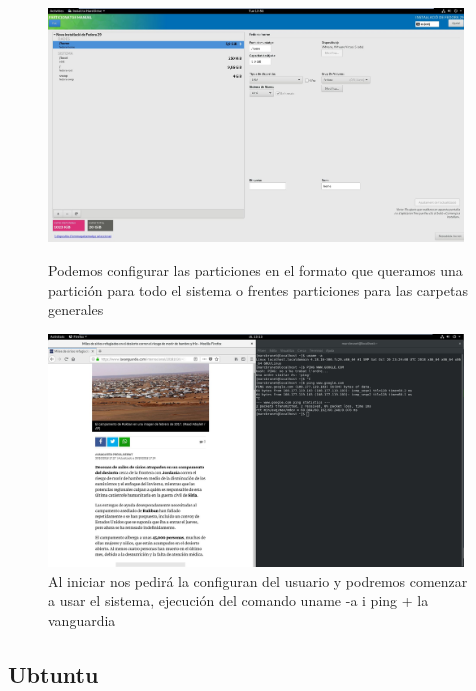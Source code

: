 \documentclass[preprint,11pt]{elsarticle}
\begin{document}
\begin{figure}[!htbp]
    \begin{center}
        \includegraphics[width=11cm]{anex/fedora3.JPG}
    \end{center}
    \caption{Podemos configurar las particiones en el formato que queramos una partición para todo el sistema o frentes particiones para las carpetas generales}
    \begin{center}
        \includegraphics[width=11cm]{anex/fedora4.JPG}
    \end{center}
    \caption{Al iniciar nos pedirá la configuran del usuario y podremos comenzar a usar el sistema, ejecución del comando uname -a i ping + la vanguardia }
\end{figure}
\clearpage

\subsection{Ubtuntu}
\end{document}
